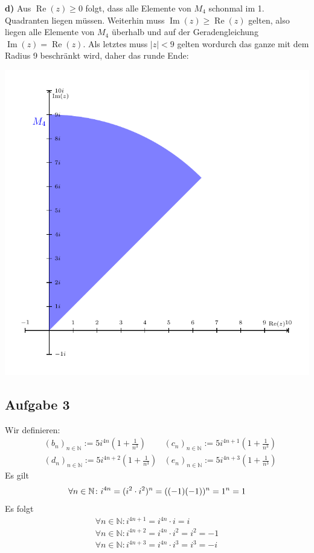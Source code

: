 \documentclass[a4paper,graphics,11pt]{article}
\newcommand{\aufgabe}[1]{\subsection*{Aufgabe #1}}
\newcommand{\re}{\operatorname{Re}}
\newcommand{\im}{\operatorname{Im}}
\begin{document}
\textbf{d)}
Aus $\re(z) \geq 0$ folgt, dass alle Elemente von $M_4$ schonmal im 1. Quadranten liegen
müssen. Weiterhin muss $\im(z) \geq \re(z)$ gelten, also liegen alle Elemente von $M_4$
überhalb und auf der Geradengleichung $\im(z) = \re(z)$. Als letztes muss $|z| < 9$ gelten
wordurch das ganze mit dem Radius 9 beschränkt wird, daher das runde Ende:\\
\strut\qquad\qquad\qquad\qquad\quad\includegraphics[scale=0.86]{graphics/graph4.pdf}
\newpage
\aufgabe{3}
Wir definieren:
\begin{align*}
    &(b_n)_{n\in \mathbb{N}} := 5i^{4n}\left(1+\frac{1}{n^3}\right)&
    (c_n)_{n\in \mathbb{N}} := 5i^{4n+1}\left(1+\frac{1}{n^3}\right)\\
    &(d_n)_{n\in \mathbb{N}} := 5i^{4n+2}\left(1+\frac{1}{n^3}\right) &
    (e_n)_{n\in \mathbb{N}} := 5i^{4n+3}\left(1+\frac{1}{n^3}\right)
\end{align*}
Es gilt
$$
    \forall n \in \mathbb{N}\colon i^{4n} = (i^2\cdot i^2)^n = ((-1)(-1))^n = 1^n = 1\\
$$
Es folgt
\begin{align*}
    \forall n \in \mathbb{N}\colon i^{4n+1} = i^{4n} \cdot i = i\\
    \forall n \in \mathbb{N}\colon i^{4n+2} = i^{4n} \cdot i^2 = i^2 = -1\\
    \forall n \in \mathbb{N}\colon i^{4n+3} = i^{4n} \cdot i^3 = i^3 = -i
\end{align*}
\end{document}
